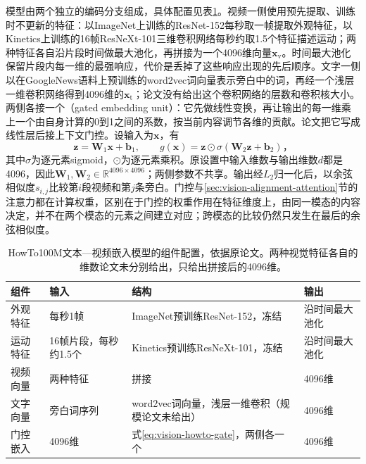 模型由两个独立的编码分支组成，具体配置见表\ref{tab:vision-understanding-howto-config}。视频一侧使用预先提取、训练时不更新的特征：以ImageNet上训练的ResNet-152每秒取一帧提取外观特征，以Kinetics上训练的16帧ResNeXt-101三维卷积网络每秒约取1.5个特征描述运动；两种特征各自沿片段时间做最大池化，再拼接为一个4096维向量$\bm x_{\mathrm v}$。时间最大池化保留片段内每一维的最强响应，代价是丢掉了这些响应出现的先后顺序。文字一侧以在GoogleNews语料上预训练的word2vec词向量表示旁白中的词，再经一个浅层一维卷积网络得到4096维的$\bm x_{\mathrm t}$；论文没有给出这个卷积网络的层数和卷积核大小。两侧各接一个（gated embedding unit）：它先做线性变换，再让输出的每一维乘上一个由自身计算的0到1之间的系数，按当前内容调节各维的贡献。论文把它写成线性层后接上下文门控。设输入为$\bm x$，有
\begin{equation}
  \bm z=\bm W_1\bm x+\bm b_1,\qquad
  g(\bm x)=\bm z\odot\sigma(\bm W_2\bm z+\bm b_2)\text{，}
  \label{eq:vision-howto-gate}
\end{equation}
其中$\sigma$为逐元素sigmoid，$\odot$为逐元素乘积。原设置中输入维数与输出维数$d$都是4096，因此$\bm W_1,\bm W_2\in\mathbb R^{4096\times4096}$；两侧参数不共享。输出经$L_2$归一化后，以余弦相似度$s_{i,j}$比较第$i$段视频和第$j$条旁白。门控与\ref{sec:vision-alignment-attention}节的注意力都在计算权重，区别在于门控的权重作用在特征维度上，由同一模态的内容决定，并不在两个模态的元素之间建立对应；跨模态的比较仍然只发生在最后的余弦相似度。

\begin{table}[htbp]
  \centering
  \small
  \begin{tabularx}{\linewidth}{@{}p{16mm}XXp{14mm}@{}}
    \toprule
    组件 & 输入 & 结构 & 输出\\
    \midrule
    外观特征 & 每秒1帧 & ImageNet预训练ResNet-152，冻结 & 沿时间最大池化\\
    运动特征 & 16帧片段，每秒约1.5个 & Kinetics预训练ResNeXt-101，冻结 & 沿时间最大池化\\
    视频向量 & 两种特征 & 拼接 & 4096维\\
    文字向量 & 旁白词序列 & word2vec词向量，浅层一维卷积（规模论文未给出） & 4096维\\
    门控嵌入 & 4096维 & 式\eqref{eq:vision-howto-gate}，两侧各一个 & 4096维\\
    \bottomrule
  \end{tabularx}
  \caption{HowTo100M文本—视频嵌入模型的组件配置，依据原论文。两种视觉特征各自的维数论文未分别给出，只给出拼接后的4096维。}
  \label{tab:vision-understanding-howto-config}
\end{table}

